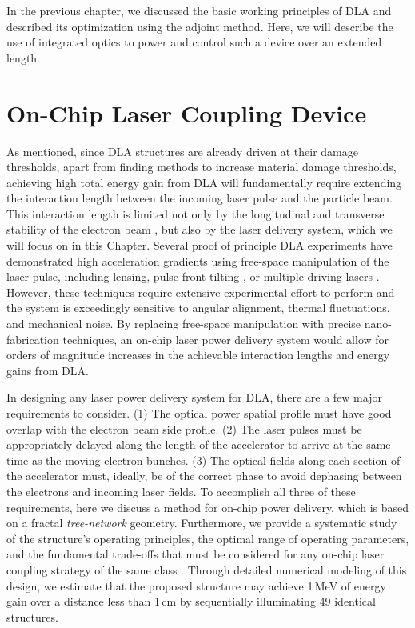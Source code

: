 
In the previous chapter, we discussed the basic working principles of DLA and described its optimization using the adjoint method.
Here, we will describe the use of integrated optics to power and control such a device over an extended length.

\section{On-Chip Laser Coupling Device}

As mentioned, since DLA structures are already driven at their damage thresholds, apart from finding methods to increase material damage thresholds, achieving high total energy gain from DLA will fundamentally require extending the interaction length between the incoming laser pulse and the particle beam.
This interaction length is limited not only by the longitudinal and transverse stability of the electron beam \cite{niedermayer2017beam, naranjo2012stable}, but also by the laser delivery system, which we will focus on in this Chapter.
Several proof of principle DLA experiments \cite{wootton2017recent, peralta2013demonstration} have demonstrated high acceleration gradients using free-space manipulation of the laser pulse, including lensing, pulse-front-tilting \cite{hebling1996derivation, akturk2004pulse, cesar2018optical}, or multiple driving lasers \cite{kenleedle, mcneur2016elements}.
However, these techniques require extensive experimental effort to perform and the system is exceedingly sensitive to angular alignment, thermal fluctuations, and mechanical noise.
By replacing free-space manipulation with precise nano-fabrication techniques, an on-chip laser power delivery system would allow for orders of magnitude increases in the achievable interaction lengths and energy gains from DLA.

In designing any laser power delivery system for DLA, there are a few major requirements to consider.
(1) The optical power spatial profile must have good overlap with the electron beam side profile.
(2) The laser pulses must be appropriately delayed along the length of the accelerator to arrive at the same time as the moving electron bunches.
(3) The optical fields along each section of the accelerator must, ideally, be of the correct phase to avoid dephasing between the electrons and incoming laser fields.
To accomplish all three of these requirements, here we discuss a method for on-chip power delivery, which is based on a fractal \textit{tree-network} geometry.
Furthermore, we provide a systematic study of the structure's operating principles, the optimal range of operating parameters, and the fundamental trade-offs that must be considered for any on-chip laser coupling strategy of the same class \cite{hughes_-chip_2018}.
Through detailed numerical modeling of this design, we estimate that the proposed structure may achieve 1\,MeV of energy gain over a distance less than 1\,cm by sequentially illuminating 49 identical structures.

